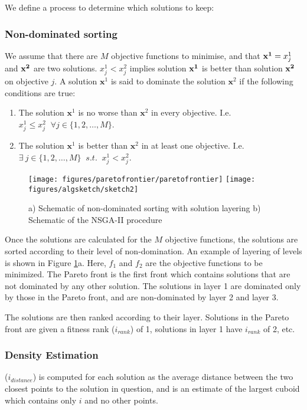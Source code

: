 \documentclass[10pt, conference, compsocconf]{IEEEtran}
\begin{document}
We define a process to determine which solutions to keep:
\subsubsection{Non-dominated sorting}
We assume that there are $M$ objective functions to minimise, and that ${\bf x^{1}} = x_j^{1}$ and $\bf x^{2}$ are two solutions. $x_j^{1}<x_j^{2}$ implies solution $\bf x^{1}$ is better than solution $\bf x^{2}$ on objective $j$. A solution $\mathbf{x}^{1}$ is said to dominate the solution $\mathbf{x}^{2}$ if the following conditions are true:
\begin{enumerate}
  \item The solution $\mathbf{x}^{1}$ is no worse than $\mathbf{x}^{2}$ in every objective. I.e. $x^{1}_j \leq x^{2}_j \;\;  \forall j \in\{1,2,\ldots,M\}$.
  \item The solution $\mathbf{x}^{1}$ is better than $\mathbf{x}^{2}$ in at least one objective. I.e. $\exists\  {j}\in \{ 1,2,\ldots,M\} \;\; s.t. \;\;x^{1}_j < x^{2}_j$.
\end{enumerate}

\begin{figure}[t] 
  \vskip -10pt
  \center
  \texttt{[image: figures/paretofrontier/paretofrontier]}
  \texttt{[image: figures/algsketch/sketch2]}
  \vskip -8pt
  \caption{a) Schematic of non-dominated sorting with solution layering b) Schematic of the NSGA-II procedure}
  \label{fig:pareto-layering}
  \vskip -15pt
\end{figure}

Once the solutions are calculated for the $M$ objective functions, the solutions are sorted according to their level of non-domination. An example of layering of levels is shown in Figure \ref{fig:pareto-layering}a. Here, $f_1$ and $f_2$ are the objective functions to be minimized. The Pareto front is the first front which contains solutions that are not dominated by any other solution. The solutions in layer 1 are dominated only by those in the Pareto front, and are non-dominated by layer 2 and layer 3. 

The solutions are then ranked according to their layer. Solutions in the Pareto front are given a fitness rank ($i_{rank}$) of 1, solutions in layer 1 have $i_{rank}$ of 2, etc.

\subsubsection{Density Estimation}
($i_{distance}$) is computed for each solution as the average distance between the two closest points to the solution in question, and is an estimate of the largest cuboid which contains only $i$ and no other points. 
\end{document}
